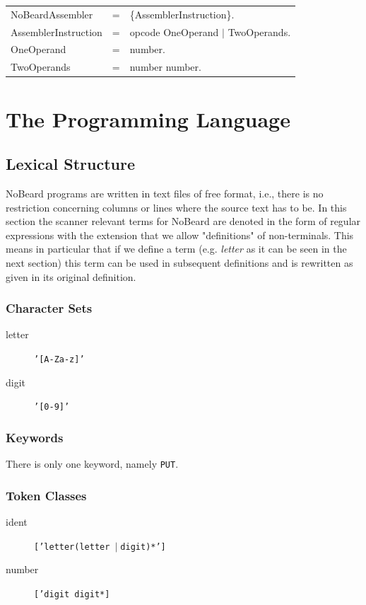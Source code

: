 \documentclass[11pt]{report}
\newcommand{\leongage}{NoBeard}
\newcommand{\alternative}{$\mid \;$}
\newenvironment{grammar}[2] %
	{
		\newcommand{\completerule}[2]{##1 & = & ##2.\\}
		\newcommand{\startrule}[2]{##1 & = & ##2\\}
		\newcommand{\alternativerule}[1]{ & $|$ & ##1\\}
		\newcommand{\alternativeend}[1]{ & $|$ & ##1.\\}
		\newcommand{\finishrule}[1]{ & & ##1.\\}
		\begin{tabular}{p{#1} c p{#2}}
	}
	{	\end{tabular}
	}
\begin{document}
\begin{grammar}{}{}
	\completerule{NoBeardAssembler}{\{AssemblerInstruction\}}
	\completerule{AssemblerInstruction}{opcode OneOperand $|$ TwoOperands}
	\completerule{OneOperand}{number}
	\completerule{TwoOperands}{number number}
\end{grammar}

\chapter{The Programming Language}
\section{Lexical Structure}

\leongage{} programs are written in text files of free format, i.e., there is no restriction concerning columns or lines where
the source text has to be. In this section the scanner relevant terms for \leongage{} are denoted in the form of regular expressions
with the extension that we allow "definitions" of non-terminals. This means in particular that if we define a term (e.g.
{\em letter} as it can be seen in the next section) this term can be used in subsequent definitions and is rewritten as
given in its original definition.

\subsection{Character Sets}
\begin{description}
	\item[letter] \texttt{'[A-Za-z]'}
	\item[digit]\texttt{'[0-9]'}
\end{description}

\subsection{Keywords}
There is only one keyword, namely \texttt{PUT}.

\subsection{Token Classes}
\begin{description}
	\item[ident] \texttt{['letter(letter \alternative digit)*']}
	\item[number] \texttt{['digit digit*]}
\end{description}
\end{document}
